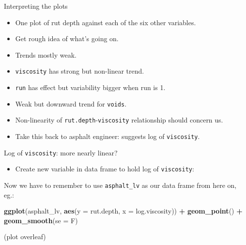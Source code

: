 \documentclass[ignorenonframetext,]{beamer}
\newenvironment{Shaded}{\begin{snugshade}}{\end{snugshade}}
\newcommand{\DataTypeTok}[1]{\textcolor[rgb]{0.13,0.29,0.53}{#1}}
\newcommand{\KeywordTok}[1]{\textcolor[rgb]{0.13,0.29,0.53}{\textbf{#1}}}
\newcommand{\NormalTok}[1]{#1}
\newcommand{\OperatorTok}[1]{\textcolor[rgb]{0.81,0.36,0.00}{\textbf{#1}}}
\newcommand{\StringTok}[1]{\textcolor[rgb]{0.31,0.60,0.02}{#1}}
\providecommand{\tightlist}{%
  \setlength{\itemsep}{0pt}\setlength{\parskip}{0pt}}
\begin{document}
\begin{frame}[fragile]{Interpreting the plots}
\protect\hypertarget{interpreting-the-plots}{}

\begin{itemize}
\tightlist
\item
  One plot of rut depth against each of the six other variables.
\item
  Get rough idea of what's going on.
\item
  Trends mostly weak.
\item
  \texttt{viscosity} has strong but non-linear trend.
\item
  \texttt{run} has effect but variability bigger when run is 1.
\item
  Weak but downward trend for \texttt{voids}.
\item
  Non-linearity of \texttt{rut.depth}-\texttt{viscosity} relationship
  should concern us.
\item
  Take this back to asphalt engineer: suggests log of
  \texttt{viscosity}.
\end{itemize}

\end{frame}

\begin{frame}[fragile]{Log of \texttt{viscosity}: more nearly linear?}
\protect\hypertarget{log-of-viscosity-more-nearly-linear}{}

\begin{itemize}
\tightlist
\item
  Create new variable in data frame to hold log of \texttt{viscosity}:
\end{itemize}

\begin{Shaded}
\end{Shaded}

Now we have to remember to use \texttt{asphalt\_lv} as our data frame
from here on, eg.:

\begin{Shaded}
\begin{Highlighting}[]
\KeywordTok{ggplot}\NormalTok{(asphalt_lv, }\KeywordTok{aes}\NormalTok{(}\DataTypeTok{y =}\NormalTok{ rut.depth, }\DataTypeTok{x =}\NormalTok{ log.viscosity)) }\OperatorTok{+}
\StringTok{  }\KeywordTok{geom_point}\NormalTok{() }\OperatorTok{+}\StringTok{ }\KeywordTok{geom_smooth}\NormalTok{(}\DataTypeTok{se =}\NormalTok{ F)}
\end{Highlighting}
\end{Shaded}

(plot overleaf)

\end{frame}
\end{document}
